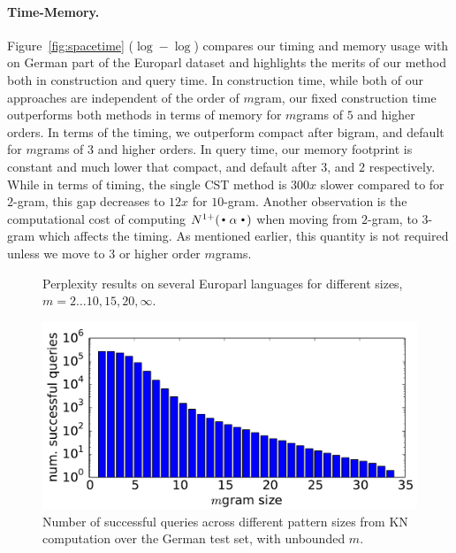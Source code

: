 \paragraph{Time-Memory.}
Figure~\ref{fig:spacetime} ($\log-\log$) compares our timing and memory usage with \SRILM on German part of the Europarl dataset and highlights the merits of our method both in construction and query time. In construction time, while both of our approaches are independent of the order of $m$gram, our fixed construction time outperforms both \SRILM methods in terms of memory for $m$grams of $5$ and higher orders. In terms of the timing, we outperform \SRILM compact after bigram, and \SRILM default for $m$grams of $3$ and higher orders. In query time, our memory footprint is constant and much lower that \SRILM compact, and default after $3$, and $2$ respectively. While in terms of timing, the single CST method is $300x$ slower compared to \SRILM for $2$-gram, this gap decreases to $12x$ for $10$-gram.  Another observation is the computational cost of computing $\nlplus{\Bigcdot \alpha \Bigcdot}$ when moving from $2$-gram, to $3$-gram which affects the timing. As mentioned earlier, this quantity is not required unless we move to $3$ or higher order $m$grams.

\begin{figure}[tb]

\caption{Perplexity results on several Europarl languages for different \ngram sizes, $m=2\ldots10,15,20,\infty$.}
\label{fig:pplx}
\end{figure}

\begin{figure}[tb]
\includegraphics[width=\columnwidth]{figures/german_pattern_size.pdf}
\caption{Number of successful queries across different pattern sizes from KN computation over the German test set, with unbounded $m$.}
\label{fig:germanpattern}
\end{figure}

